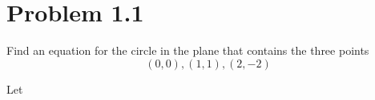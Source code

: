 \section*{Problem 1.1}

Find an equation for the circle in the plane that contains the three points
\[ (0, 0), (1, 1), (2,-2) \]

Let 